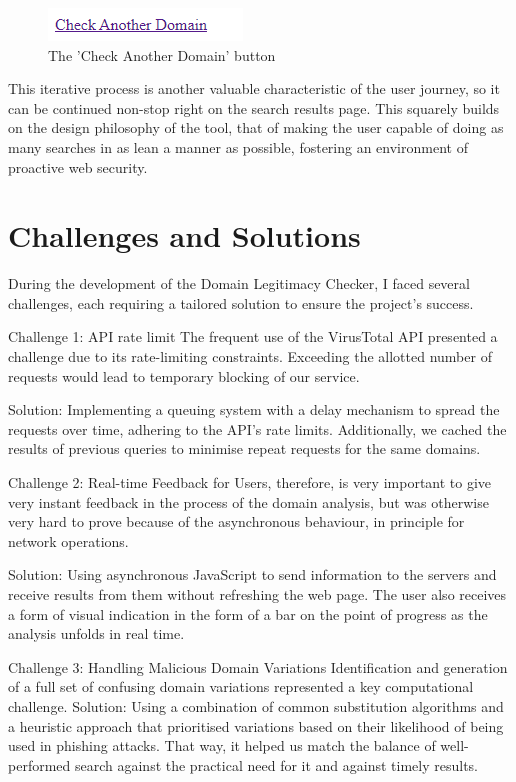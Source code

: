\begin{figure}[H]
    \centering
    \includegraphics[width=0.3\linewidth]{project/ii.png}
    \caption{The 'Check Another Domain' button}
    \label{fig:enter-label}
\end{figure}

This iterative process is another valuable characteristic of the user journey, so it can be continued non-stop right on the search results page. This squarely builds on the design philosophy of the tool, that of making the user capable of doing as many searches in as lean a manner as possible, fostering an environment of proactive web security.




\section{Challenges and Solutions}

During the development of the Domain Legitimacy Checker, I faced several challenges, each requiring a tailored solution to ensure the project's success.

Challenge 1: API rate limit
The frequent use of the VirusTotal API presented a challenge due to its rate-limiting constraints. Exceeding the allotted number of requests would lead to temporary blocking of our service.

Solution: Implementing a queuing system with a delay mechanism to spread the requests over time, adhering to the API's rate limits. Additionally, we cached the results of previous queries to minimise repeat requests for the same domains.

Challenge 2: Real-time Feedback for Users, therefore, is very important to give very instant feedback in the process of the domain analysis, but was otherwise very hard to prove because of the asynchronous behaviour, in principle for network operations.

Solution: Using asynchronous JavaScript to send information to the servers and receive results from them without refreshing the web page. The user also receives a form of visual indication in the form of a bar on the point of progress as the analysis unfolds in real time.

Challenge 3: Handling Malicious Domain Variations
Identification and generation of a full set of confusing domain variations represented a key computational challenge.
Solution: Using a combination of common substitution algorithms and a heuristic approach that prioritised variations based on their likelihood of being used in phishing attacks. That way, it helped us match the balance of well-performed search against the practical need for it and against timely results.

